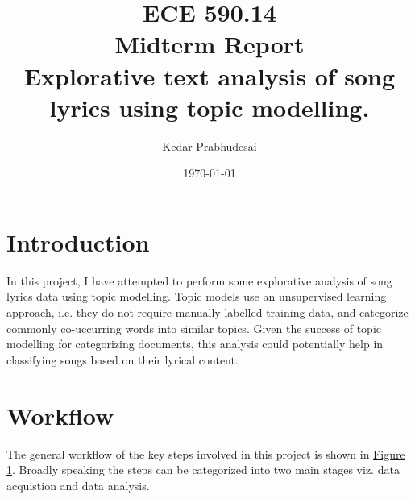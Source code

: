 \documentclass{article}
\title{ECE 590.14 \protect\\ Midterm Report \protect\\ Explorative text analysis of song lyrics using topic modelling.}
\author{Kedar Prabhudesai}
\date{\today}
\begin{document}
\maketitle
  \section{Introduction}
  In this project, I have attempted to perform some explorative analysis of song lyrics data using topic modelling. Topic models use an unsupervised learning approach, i.e. they do not require manually labelled training data, and categorize commonly co-uccurring words into similar topics. Given the success of topic modelling for categorizing documents, this analysis could potentially help in classifying songs based on their lyrical content.
  \section{Workflow}
  The general workflow of the key steps involved in this project is shown in \href{fig:flow}{Figure 1}. Broadly speaking the steps can be categorized into two main stages viz. data acquistion and data analysis.
\end{document}
